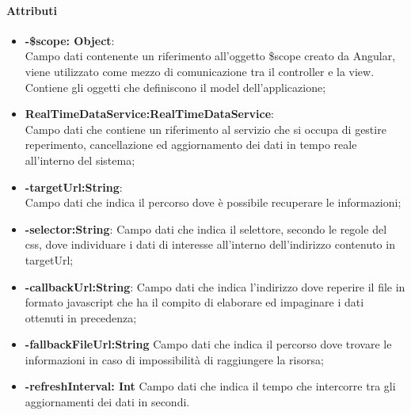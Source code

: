 	\paragraph{Attributi}
	\begin{itemize}
		\item \textbf{-\$scope: Object}:\\
			Campo dati contenente un riferimento all'oggetto \$scope creato da Angular, viene utilizzato come mezzo di comunicazione tra il controller e la view. Contiene gli oggetti che definiscono il model dell'applicazione;
		\item \textbf{RealTimeDataService:RealTimeDataService}:\\
			Campo dati che contiene un riferimento al servizio che si occupa di gestire reperimento, cancellazione ed aggiornamento dei dati in tempo reale all'interno del sistema;
		\item \textbf{-targetUrl:String}:\\
			Campo dati che indica il percorso dove è possibile recuperare le informazioni;
		\item \textbf{-selector:String}:
			Campo dati che indica il selettore, secondo le regole del css, dove individuare i dati di interesse all'interno dell'indirizzo contenuto in targetUrl;
		\item \textbf{-callbackUrl:String}:
			Campo dati che indica l'indirizzo dove reperire il file in formato javascript che ha il compito di elaborare ed impaginare i dati ottenuti in precedenza;
		\item \textbf{-fallbackFileUrl:String}
			Campo dati che indica il percorso dove trovare le informazioni in caso di impossibilità di raggiungere la risorsa;
		\item \textbf{-refreshInterval: Int}
			Campo dati che indica il tempo che intercorre tra gli aggiornamenti dei dati in secondi.
			
	\end{itemize}
	
